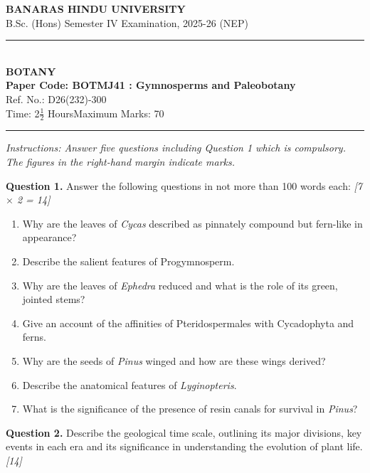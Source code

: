 \documentclass[11pt,a4paper]{article}
\newcommand{\pts}[1]{\hfill \textit{[#1]}}
\begin{document}
\begin{center}
  {\large\bfseries BANARAS HINDU UNIVERSITY}\\[2pt]
  {\normalsize B.Sc. (Hons) Semester IV Examination, 2025-26 (NEP)}\\[6pt]
  \rule{0.8\linewidth}{0.5pt}\\[6pt]
  {\large\bfseries BOTANY}\\[4pt]
  {\large\bfseries Paper Code: BOTMJ41 : Gymnosperms and Paleobotany}\\[2pt]
  {\small Ref. No.: D26(232)-300}\\[4pt]
  {\normalsize Time: 2$\frac{1}{2}$ Hours\hfill Maximum Marks: 70}
\end{center}

\rule{\linewidth}{0.4pt}

\smallskip

\noindent \textit{Instructions: Answer five questions including Question 1 which is compulsory. The figures in the right-hand margin indicate marks.}

\bigskip

\noindent \textbf{Question 1.} Answer the following questions in not more than 100 words each: \pts{7 $\times$ 2 = 14}
\begin{enumerate}[label=(\alph*)]
  \item Why are the leaves of \textit{Cycas} described as pinnately compound but fern-like in appearance?
  \item Describe the salient features of Progymnosperm.
  \item Why are the leaves of \textit{Ephedra} reduced and what is the role of its green, jointed stems?
  \item Give an account of the affinities of Pteridospermales with Cycadophyta and ferns.
  \item Why are the seeds of \textit{Pinus} winged and how are these wings derived?
  \item Describe the anatomical features of \textit{Lyginopteris}.
  \item What is the significance of the presence of resin canals for survival in \textit{Pinus}?
\end{enumerate}

\bigskip

\noindent \textbf{Question 2.} Describe the geological time scale, outlining its major divisions, key events in each era and its significance in understanding the evolution of plant life. \pts{14}

\bigskip
\end{document}
